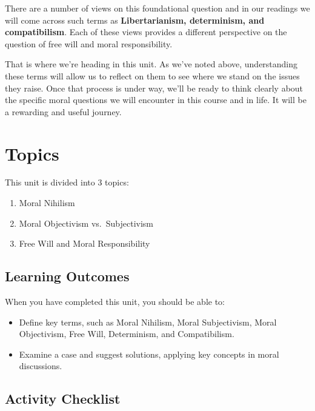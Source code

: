 \documentclass[
]{book}
\providecommand{\tightlist}{%
  \setlength{\itemsep}{0pt}\setlength{\parskip}{0pt}}
\begin{document}
There are a number of views on this foundational question and in our readings we will come across such terms as \textbf{Libertarianism, determinism, and compatibilism}. Each of these views provides a different perspective on the question of free will and moral responsibility.

That is where we're heading in this unit. As we've noted above, understanding these terms will allow us to reflect on them to see where we stand on the issues they raise. Once that process is under way, we'll be ready to think clearly about the specific moral questions we will encounter in this course and in life. It will be a rewarding and useful journey.

\hypertarget{topics-1}{%
\section*{Topics}\label{topics-1}}

This unit is divided into 3 topics:

\begin{enumerate}
\def\labelenumi{\arabic{enumi}.}
\tightlist
\item
  Moral Nihilism\\
\item
  Moral Objectivism vs.~Subjectivism\\
\item
  Free Will and Moral Responsibility
\end{enumerate}

\hypertarget{learning-outcomes-1}{%
\subsection*{Learning Outcomes}\label{learning-outcomes-1}}

When you have completed this unit, you should be able to:

\begin{itemize}
\tightlist
\item
  Define key terms, such as Moral Nihilism, Moral Subjectivism, Moral Objectivism, Free Will, Determinism, and Compatibilism.\\
\item
  Examine a case and suggest solutions, applying key concepts in moral discussions.
\end{itemize}

\hypertarget{activity-checklist-1}{%
\subsection*{Activity Checklist}\label{activity-checklist-1}}
\end{document}
